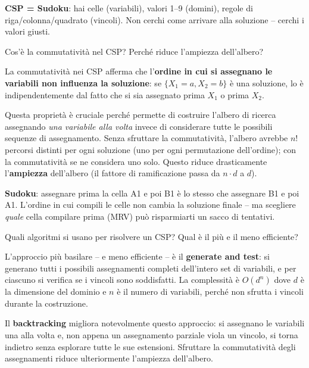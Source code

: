 \documentclass[12pt,a4paper]{article}
\begin{document}
\begin{ricordabox}
\textbf{CSP = Sudoku}: hai celle (variabili), valori 1--9 (domini), regole di riga/colonna/quadrato (vincoli). Non cerchi come arrivare alla soluzione -- cerchi i valori giusti.
\end{ricordabox}

\begin{domandabox}{Cos'è la commutatività nel CSP? Perché riduce l'ampiezza dell'albero?}
\end{domandabox}

La commutatività nei CSP afferma che l'\textbf{ordine in cui si assegnano le variabili non influenza la soluzione}: se $\{X_1 = a, X_2 = b\}$ è una soluzione, lo è indipendentemente dal fatto che si sia assegnato prima $X_1$ o prima $X_2$.

Questa proprietà è cruciale perché permette di costruire l'albero di ricerca assegnando \emph{una variabile alla volta} invece di considerare tutte le possibili sequenze di assegnamento. Senza sfruttare la commutatività, l'albero avrebbe $n!$ percorsi distinti per ogni soluzione (uno per ogni permutazione dell'ordine); con la commutatività se ne considera uno solo. Questo riduce drasticamente l'\textbf{ampiezza} dell'albero (il fattore di ramificazione passa da $n \cdot d$ a $d$).

\begin{ricordabox}
\textbf{Sudoku}: assegnare prima la cella A1 e poi B1 è lo stesso che assegnare B1 e poi A1. L'ordine in cui compili le celle non cambia la soluzione finale -- ma scegliere \emph{quale} cella compilare prima (MRV) può risparmiarti un sacco di tentativi.
\end{ricordabox}

\begin{domandabox}{Quali algoritmi si usano per risolvere un CSP? Qual è il più e il meno efficiente?}
\end{domandabox}

L'approccio più basilare -- e meno efficiente -- è il \textbf{generate and test}: si generano tutti i possibili assegnamenti completi dell'intero set di variabili, e per ciascuno si verifica se i vincoli sono soddisfatti. La complessità è $O(d^n)$ dove $d$ è la dimensione del dominio e $n$ è il numero di variabili, perché non sfrutta i vincoli durante la costruzione.

Il \textbf{backtracking} migliora notevolmente questo approccio: si assegnano le variabili una alla volta e, non appena un assegnamento parziale viola un vincolo, si torna indietro senza esplorare tutte le sue estensioni. Sfruttare la commutatività degli assegnamenti riduce ulteriormente l'ampiezza dell'albero.
\end{document}
